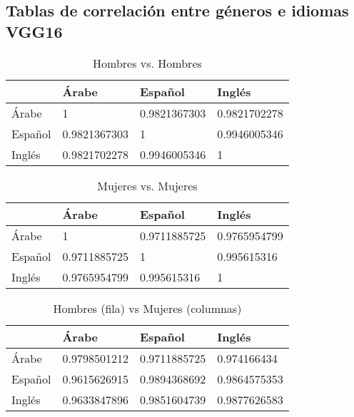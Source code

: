 \subsection{Tablas de correlación entre géneros e idiomas VGG16}
\begin{table}[!h]

\centering
\caption{Hombres vs. Hombres}
\label{male-vs-male-correlation}
\begin{tabular}{|l|l|l|l|}
\hline
        & Árabe        & Español      & Inglés       \\ \hline
Árabe   & 1            & 0.9821367303 & 0.9821702278 \\ \hline
Español & 0.9821367303 & 1            & 0.9946005346 \\ \hline
Inglés  & 0.9821702278 & 0.9946005346 & 1            \\ \hline
\end{tabular}
\end{table}

\begin{table}[!h]
\centering
\caption{Mujeres vs. Mujeres}
\label{female-vs-female-correlation}
\begin{tabular}{|l|l|l|l|}
\hline
        & Árabe        & Español      & Inglés       \\ \hline
Árabe   & 1            & 0.9711885725 & 0.9765954799 \\ \hline
Español & 0.9711885725 & 1            & 0.995615316  \\ \hline
Inglés  & 0.9765954799 & 0.995615316  & 1            \\ \hline
\end{tabular}
\end{table}

\begin{table}[!h]
\centering
\caption{Hombres (fila) vs Mujeres (columnas)}
\label{male-female-correlation}
\begin{tabular}{|l|l|l|l|}
\hline
        & Árabe        & Español      & Inglés       \\ \hline
Árabe   & 0.9798501212 & 0.9711885725 & 0.974166434  \\ \hline
Español & 0.9615626915 & 0.9894368692 & 0.9864575353 \\ \hline
Inglés  & 0.9633847896 & 0.9851604739 & 0.9877626583 \\ \hline
\end{tabular}
\end{table}

